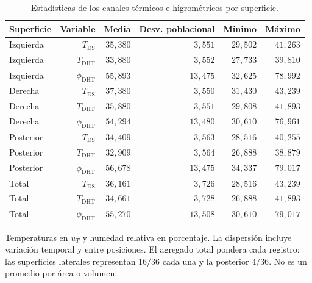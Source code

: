 \begin{table}[htbp]
\centering
\caption{Estadísticas de los canales térmicos e higrométricos por superficie.}
\label{tab:res_descriptivos}
\small
\setlength{\tabcolsep}{5pt}
\begin{tabular}{lrrrrr}
\toprule
Superficie & Variable & Media & Desv. poblacional & Mínimo & Máximo \\
\midrule
Izquierda & $T_{\mathrm{DS}}$ & $35{,}380$ & $3{,}551$ & $29{,}502$ & $41{,}263$ \\
Izquierda & $T_{\mathrm{DHT}}$ & $33{,}880$ & $3{,}552$ & $27{,}733$ & $39{,}810$ \\
Izquierda & $\phi_{\mathrm{DHT}}$ & $55{,}893$ & $13{,}475$ & $32{,}625$ & $78{,}992$ \\
Derecha & $T_{\mathrm{DS}}$ & $37{,}380$ & $3{,}550$ & $31{,}430$ & $43{,}239$ \\
Derecha & $T_{\mathrm{DHT}}$ & $35{,}880$ & $3{,}551$ & $29{,}808$ & $41{,}893$ \\
Derecha & $\phi_{\mathrm{DHT}}$ & $54{,}294$ & $13{,}480$ & $30{,}610$ & $76{,}961$ \\
Posterior & $T_{\mathrm{DS}}$ & $34{,}409$ & $3{,}563$ & $28{,}516$ & $40{,}255$ \\
Posterior & $T_{\mathrm{DHT}}$ & $32{,}909$ & $3{,}564$ & $26{,}888$ & $38{,}879$ \\
Posterior & $\phi_{\mathrm{DHT}}$ & $56{,}678$ & $13{,}475$ & $34{,}337$ & $79{,}017$ \\
Total & $T_{\mathrm{DS}}$ & $36{,}161$ & $3{,}726$ & $28{,}516$ & $43{,}239$ \\
Total & $T_{\mathrm{DHT}}$ & $34{,}661$ & $3{,}728$ & $26{,}888$ & $41{,}893$ \\
Total & $\phi_{\mathrm{DHT}}$ & $55{,}270$ & $13{,}508$ & $30{,}610$ & $79{,}017$ \\
\bottomrule
\end{tabular}
\par\vspace{3pt}
\begin{minipage}{0.98\textwidth}\footnotesize
Temperaturas en $u_T$ y humedad relativa en porcentaje. La dispersión incluye variación temporal y entre posiciones. El agregado total pondera cada registro: las superficies laterales representan $16/36$ cada una y la posterior $4/36$. No es un promedio por área o volumen.
\end{minipage}
\end{table}
